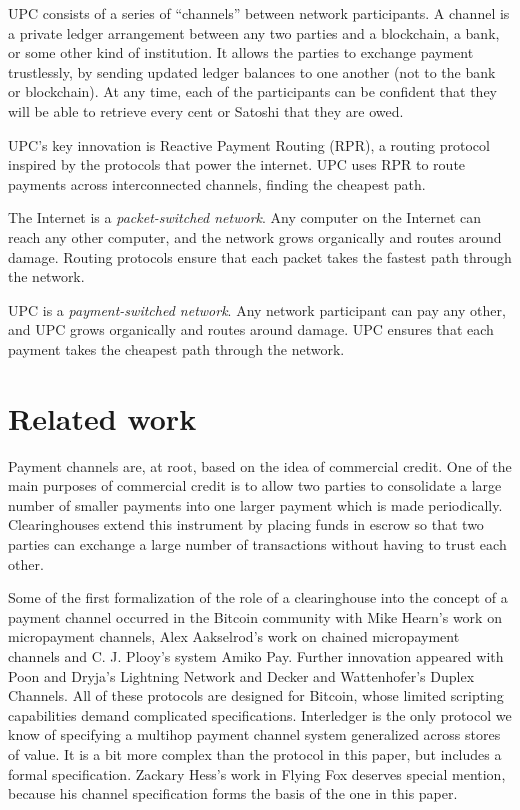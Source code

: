 \documentclass[a4paper]{article}
\begin{document}
UPC consists of a series of ``channels'' between network participants. A channel is a private ledger arrangement between any two parties and a blockchain, a bank, or some other kind of institution. It allows the parties to exchange payment trustlessly, by sending updated ledger balances to one another (not to the bank or blockchain). At any time, each of the participants can be confident that they will be able to retrieve every cent or Satoshi that they are owed.

UPC's key innovation is Reactive Payment Routing (RPR), a routing protocol inspired by the protocols that power the internet. UPC uses RPR to route payments across interconnected channels, finding the cheapest path.

The Internet is a \emph{packet-switched network}. Any computer on the Internet can reach any other computer, and the network grows organically and routes around damage. Routing protocols ensure that each packet takes the fastest path through the network.

UPC is a \emph{payment-switched network}. Any network participant can pay any other, and UPC grows organically and routes around damage. UPC ensures that each payment takes the cheapest path through the network.

\section*{Related work}
Payment channels are, at root, based on the idea of commercial credit. One of the main purposes of commercial credit is to allow two parties to consolidate a large number of smaller payments into one larger payment which is made periodically. Clearinghouses extend this instrument by placing funds in escrow so that two parties can exchange a large number of transactions without having to trust each other.

Some of the first formalization of the role of a clearinghouse into the concept of a payment channel occurred in the Bitcoin community with Mike Hearn's work on micropayment channels\cite{btcwiki}\cite{bitcoinj}, Alex Aakselrod's work on chained micropayment channels\cite{blueadept} and C. J. Plooy's system Amiko Pay\cite{amiko}. Further innovation appeared with Poon and Dryja's Lightning Network\cite{lightning} and Decker and Wattenhofer's Duplex Channels\cite{duplexchannels}. All of these protocols are designed for Bitcoin, whose limited scripting capabilities demand complicated specifications. Interledger\cite{interledger} is the only protocol we know of specifying a multihop payment channel system generalized across stores of value. It is a bit more complex than the protocol in this paper, but includes a formal specification. Zackary Hess's work in Flying Fox\cite{flyingfox} deserves special mention, because his channel specification forms the basis of the one in this paper.
\end{document}
